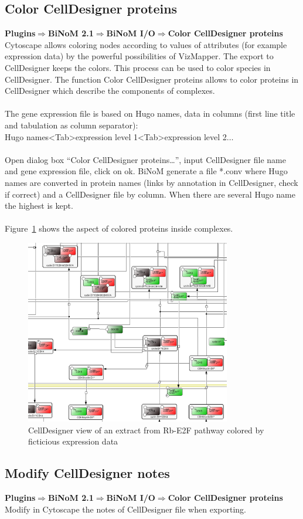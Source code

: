 \subsection{Color CellDesigner proteins}
\textbf{Plugins$\Rightarrow$BiNoM 2.1$\Rightarrow$BiNoM I/O$\Rightarrow$Color CellDesigner proteins}\\
Cytoscape allows coloring nodes according to values of attributes (for example expression data) by the powerful possibilities of VizMapper. The export to CellDesigner keeps the colors. This process can be used to color species in CellDesigner. The function Color CellDesigner proteins allows to color proteins in CellDesigner which describe the components of complexes.\\\\
The gene expression file is based on Hugo names, data in columns (first line title and tabulation as column separator):\\Hugo names\textless Tab\textgreater expression level 1\textless Tab\textgreater expression level 2$\ldots$\\\\
Open dialog box “Color CellDesigner proteins…”, input CellDesigner file name and gene expression file, click on ok. BiNoM generate a file *.conv where Hugo names are converted in protein names (links by annotation in CellDesigner, check if correct) and a CellDesigner file by column. When there are several Hugo name the highest is kept.\\\\
Figure~\ref{Colored_CellDesigner_view_by_ficticious_data} shows the aspect of colored proteins inside complexes.
\begin{figure}
\centering
\includegraphics[width=0.8\textwidth]{graphics/Colored_CellDesigner_view_by_ficticious_data}
\caption{CellDesigner view of an extract from Rb-E2F\cite{calzone2008comprehensive} pathway colored by ficticious expression data}
\label{Colored_CellDesigner_view_by_ficticious_data}
\end{figure}



\subsection{Modify CellDesigner notes}
\textbf{Plugins$\Rightarrow$BiNoM 2.1$\Rightarrow$BiNoM I/O$\Rightarrow$Color CellDesigner proteins}\\
Modify in Cytoscape the notes of CellDesigner file when exporting.
